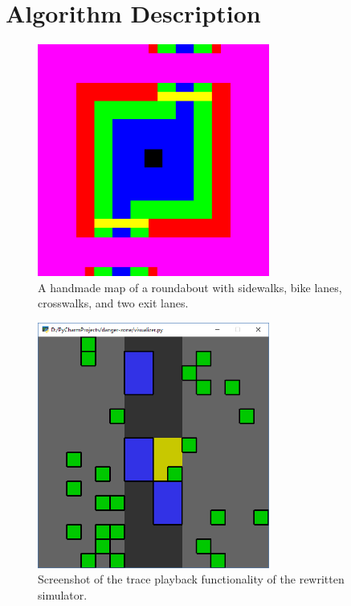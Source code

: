 \chapter{Algorithm Description} \label{chap:algorithm}

\begin{figure}
    \label{fig:map-roundabout}
    \centering
    \includegraphics[width=3in]{images/map-roundabout.png}
    \caption{A handmade map of a roundabout with sidewalks, bike lanes, crosswalks, and two exit lanes.}
\end{figure}

\begin{figure}
    \label{fig:screenshot-discrete}
    \centering
    \includegraphics[width=3in]{images/screenshot-discrete.png}
    \caption{Screenshot of the trace playback functionality of the rewritten simulator.}
\end{figure}

